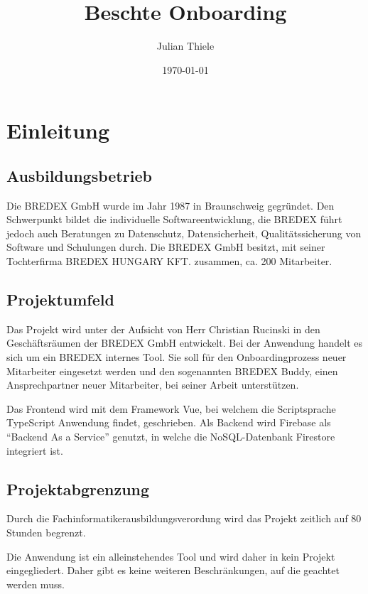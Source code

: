 \documentclass[12pt]{article}
\title{Beschte Onboarding}
\date{\today}
\author{Julian Thiele}
\begin{document}
\sloppy

\maketitle
\newpage

\tableofcontents
\newpage

%
%

\section{Einleitung}

\subsection{Ausbildungsbetrieb}
Die BREDEX GmbH wurde im Jahr 1987 in Braunschweig gegründet. Den Schwerpunkt 
bildet die individuelle Softwareentwicklung, die BREDEX führt jedoch auch 
Beratungen zu Datenschutz, Datensicherheit, Qualitätssicherung von Software 
und Schulungen durch. Die BREDEX GmbH besitzt, mit seiner Tochterfirma BREDEX 
HUNGARY KFT. zusammen, ca. 200 Mitarbeiter. 

\subsection{Projektumfeld}
Das Projekt wird unter der Aufsicht von Herr Christian Rucinski in den 
Geschäftsräumen der BREDEX GmbH entwickelt. Bei der Anwendung handelt es sich 
um ein BREDEX internes Tool. Sie soll für den Onboardingprozess neuer Mitarbeiter 
eingesetzt werden und den sogenannten BREDEX Buddy, einen Ansprechpartner 
neuer Mitarbeiter, bei seiner Arbeit unterstützen. 

Das Frontend wird mit dem Framework Vue, bei welchem die Scriptsprache TypeScript 
Anwendung findet, geschrieben. Als Backend wird Firebase als “Backend As a Service” 
genutzt, in welche die NoSQL-Datenbank Firestore integriert ist.

\subsection{Projektabgrenzung}
Durch die Fachinformatikerausbildungsverordung wird das Projekt zeitlich auf 80 
Stunden begrenzt.  

Die Anwendung ist ein alleinstehendes Tool und wird daher in kein Projekt 
eingegliedert. Daher gibt es keine weiteren Beschränkungen, auf die geachtet 
werden muss.  
\end{document}
